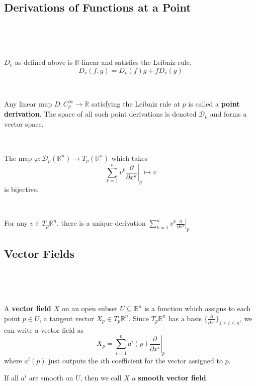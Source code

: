 \documentclass{article}
\begin{document}
\subsection{Derivations of Functions at a Point}
\

\begin{proposition}
  \

  $D_v$ as defined above is $\mathbb{R}$-linear and satisfies the Leibniz rule, $$D_v(f,g) = D_v(f)g + fD_v(g)$$
\end{proposition}

\begin{definition}
  \

  Any linear map $D: C^\infty_p \to \mathbb{R}$ satisfying the Leibniz rule at $p$ is called a \textbf{point derivation}. The space of all such point derivations is denoted $\mathcal{D}_p$ and forms a vector space.
\end{definition}

\begin{proposition}
  \

  The map $\varphi: \mathcal{D}_p(\mathbb{R}^n) \to T_p(\mathbb{R}^n)$ which takes $$\sum_{k=1}^n v^k \left.\frac{\partial}{\partial x^k}\right\vert_p \mapsto v$$ is bijective.
\end{proposition}

\begin{customproof}
  \

  For any $v \in T_p \mathbb{R}^n$, there is a unique derivation $\sum_{k=1}^n v^k \left.\frac{\partial}{\partial x^k}\right\vert_p$
\end{customproof}

\subsection{Vector Fields}
\

\begin{definition}
  \

  A \textbf{vector field} $X$ on an open subset $U \subseteq \mathbb{R}^n$ is a function which assigns to each point $p \in U$, a tangent vector $X_p \in T_p \mathbb{R}^n$. Since $T_p \mathbb{R}^n$ has a basis $\{\frac{\partial }{\partial x^i}\}_{1 \leq i \leq n}$, we can write a vector field as $$X_p = \sum_{i = 1}^n a^i(p)\left.\frac{\partial}{\partial x^i}\right\vert_p$$where $a^i(p)$ just outputs the $i$th coefficient for the vector assigned to $p$.

  If all $a^i$ are smooth on $U$, then we call $X$ a \textbf{smooth vector field}.
\end{definition}
\end{document}
